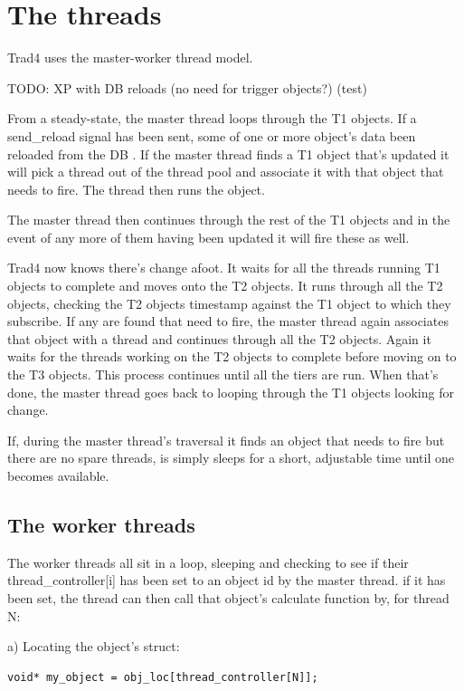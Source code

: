 \documentclass{report}
\begin{document}
\section{The threads}

Trad4 uses the master-worker thread model.

TODO: XP with DB reloads (no need for trigger objects?) (test)

From a steady-state, the master thread loops through the T1 objects. If a send_reload signal has been sent, some of one or more object's data been reloaded from the DB . If the master thread finds a T1 object that's updated it will pick a thread out of the thread pool and associate it with that object that needs to fire. The thread then runs the object. 

The master thread then continues through the rest of the T1 objects and in the event of any more of them having been updated it will fire these as well.

Trad4 now knows there's change afoot. It waits for all the threads running T1 objects to complete and moves onto the T2 objects. It runs through all the T2 objects, checking the T2 objects timestamp against the T1 object to which they subscribe. If any are found that need to fire, the master thread again associates that object with a thread and continues through all the T2 objects. Again it waits for the threads working on the T2 objects to complete before moving on to the T3 objects.  This process continues until all the tiers are run. When that's done, the master thread goes back to looping through the T1 objects looking for change.  

If, during the master thread's traversal it finds an object that needs to fire but there are no spare threads, is simply sleeps for a short, adjustable time until one becomes available.

\subsection{The worker threads}

The worker threads all sit in a loop, sleeping and checking to see if their thread_controller[i] has been set to an object id by the master thread. if it has been set, the thread can then call that object's calculate 
function by, for thread N:

a) Locating the object's struct:
\begin{verbatim}
void* my_object = obj_loc[thread_controller[N]];
\end{verbatim}
\end{document}
